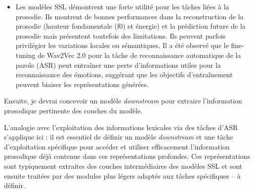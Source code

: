 \documentclass[11pt,a4paper]{article}
\begin{document}
\begin{enumerate}
\begin{itemize}
        \item Les modèles SSL démontrent une forte utilité pour les tâches liées à la prosodie. Ils montrent de bonnes performances dans la reconstruction de la prosodie (hauteur fondamentale (f0) et énergie) et la prédiction future de la prosodie \cite{lin2022utilityselfsupervisedmodelsprosodyrelated} mais présentent toutefois des limitations. Ils peuvent parfois privilégier les variations locales ou sémantiques. \cite{qu2023disentanglingprosodyrepresentationsunsupervised} Il a été observé que le fine-tuning de Wav2Vec 2.0 pour la tâche de reconnaissance automatique de la parole (ASR) peut entraîner une perte d'informations utiles pour la reconnaissance des émotions, suggérant que les objectifs d'entraînement peuvent biaiser les représentations générées. \cite{wang2022finetunedwav2vec20hubertbenchmark} \cite{pepino2021emotionrecognitionspeechusing} \newline
        
    \end{itemize}
\end{enumerate}

Ensuite, je devrai concevoir un modèle \textit{downstream} pour extraire l'information prosodique pertinente des couches du modèle. \newline

L'analogie avec l'exploitation des informations lexicales via des tâches d'ASR s'applique ici : il est essentiel de définir un modèle \textit{downstream} et une tâche d'exploitation spécifique pour accéder et utiliser efficacement l'information prosodique déjà contenue dans ces représentations profondes. Ces représentations sont typiquement extraites des couches intermédiaires des modèles SSL et sont ensuite traitées par des modules plus légers adaptés aux tâches spécifiques -- à définir.
\end{document}
